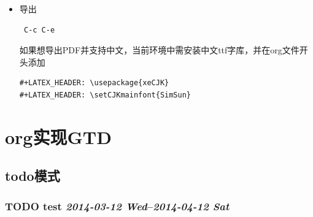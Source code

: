 \documentclass[11pt]{article}
\begin{document}
\begin{itemize}
\begin{verbatim}
\end{verbatim}
      引用区块,通常用于引用，与默认格式相比左右都会留出缩进：

\begin{verbatim}
\begin{quote}
缩进区块
\end{quote}

\end{verbatim}

      居中区块

\begin{verbatim}
\begin{center}
Everything should be made as simple as possible, \\
but not any simpler
\end{center}

\end{verbatim}

      代码区块

\begin{verbatim}
    #+BEGIN_SRC ruby
require 'redcarpet'
md = Redcarpet.new("Hello, world.")
puts md.to_html
    #+END_SRC
\end{verbatim}

      例子

\begin{verbatim}
: 单行的例子以冒号开头

      :#+BEGIN_EXAMPLE
      多行的例子
      使用区块
      :#+END_EXAMPLE
\end{verbatim}

\item 导出
\label{sec-6-2-3-3}%
\begin{verbatim}
 C-c C-e
\end{verbatim}
如果想导出PDF并支持中文，当前环境中需安装中文ttf字库，并在org文件开头添加

\begin{verbatim}
#+LATEX_HEADER: \usepackage{xeCJK}
#+LATEX_HEADER: \setCJKmainfont{SimSun}
\end{verbatim}

\end{itemize} %
\section{org实现GTD}
\label{sec-7}
\subsection{todo模式}
\label{sec-7-1}
\subsubsection{\textbf{TODO} test    \textit{2014-03-12 Wed}--\textit{2014-04-12 Sat}}
\label{sec-7-1-1}
\end{document}
